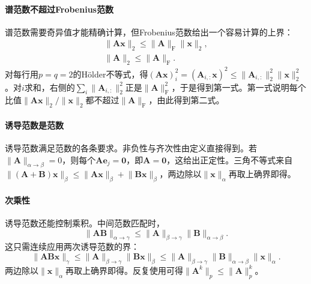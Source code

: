 \paragraph{谱范数不超过Frobenius范数}
谱范数需要奇异值才能精确计算，但Frobenius范数给出一个容易计算的上界：
\[
 \begin{gathered}
 \lVert\bm A\bm x\rVert_2\leq\lVert\bm A\rVert_{\mathrm F}\lVert\bm x\rVert_2,\\
 \lVert\bm A\rVert_2\leq\lVert\bm A\rVert_{\mathrm F}.
 \end{gathered}
\]
对每行用$p=q=2$的Hölder不等式，得$(\bm A\bm x)_i^2=(\bm A_{i,:}\bm x)^2\leq\lVert\bm A_{i,:}\rVert_2^2\lVert\bm x\rVert_2^2$。对$i$求和，右侧的$\sum_i\lVert\bm A_{i,:}\rVert_2^2$正是$\lVert\bm A\rVert_{\mathrm F}^2$，于是得到第一式。第一式说明每个比值$\lVert\bm A\bm x\rVert_2/\lVert\bm x\rVert_2$都不超过$\lVert\bm A\rVert_{\mathrm F}$，由此得到第二式。

\paragraph{诱导范数是范数}
诱导范数满足范数的各条要求。非负性与齐次性由定义直接得到。若$\lVert\bm A\rVert_{\alpha\to\beta}=0$，则每个$\bm A\bm e_j=\bm0$，即$\bm A=\bm0$，这给出正定性。三角不等式来自$\lVert(\bm A+\bm B)\bm x\rVert_\beta\leq\lVert\bm A\bm x\rVert_\beta+\lVert\bm B\bm x\rVert_\beta$，两边除以$\lVert\bm x\rVert_\alpha$再取上确界即得。

\paragraph{次乘性}
诱导范数还能控制乘积。中间范数匹配时，
\[
 \lVert\bm A\bm B\rVert_{\alpha\to\gamma}
 \leq\lVert\bm A\rVert_{\beta\to\gamma}
 \lVert\bm B\rVert_{\alpha\to\beta}.
\]
这只需连续应用两次诱导范数的界：
\[
 \lVert\bm A\bm B\bm x\rVert_\gamma\leq\lVert\bm A\rVert_{\beta\to\gamma}\lVert\bm B\bm x\rVert_\beta\leq\lVert\bm A\rVert_{\beta\to\gamma}\lVert\bm B\rVert_{\alpha\to\beta}\lVert\bm x\rVert_\alpha.
\]
两边除以$\lVert\bm x\rVert_\alpha$再取上确界即得。反复使用可得$\lVert\bm A^k\rVert_p\leq\lVert\bm A\rVert_p^k$。

